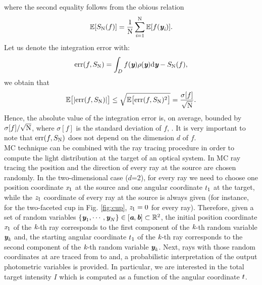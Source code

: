 where the second equality follows from the obious relation
\begin{equation}
\mathbb{E}[S_{\textrm{N}}(f)] = \frac{1}{\textrm{N}}\sum_{\textit{i}=1}^{\textrm{N}}\mathbb{E}[ f(\textit{\textbf{y}}_{\textit{i}})].
\end{equation}
Let us denote the integration error with:
\begin{equation}
\textrm{err}(f, S_{\textrm{N}}) =\int_{D}f(\textit{\textbf{y}})\rho(\textit{\textbf{y}}) \textrm{d}\textit{\textbf{y}}-S_{\textrm{N}}(f),
\end{equation}
we obtain that
\begin{equation}\label{eq:mean_error}
\mathbb{E}\big[|\textrm{err}(f, S_{\textrm{N}})|\big]\leq\sqrt{\mathbb{E}\big[\textrm{err}(f, S_{\textrm{N}})^2\big]} = \frac{\sigma[f]}{\sqrt{\textrm{N}}}.
\end{equation}
Hence, the absolute value of the integration error is, on average, bounded by $\sigma[f]/\sqrt{\textrm{N}}$, where $\sigma[f]$ is the standard deviation of $f$, \cite{leobacher2014introduction}. It is very important to note that $\textrm{err}(f, S_{\textrm{N}})$ does not depend on the dimension $d$ of $f$.
\\ \indent MC technique can be combined with the ray tracing procedure in order to compute the light distribution at the target of an optical system.
In MC ray tracing the position and the direction of  every ray at the source are chosen randomly. 
In the two-dimensional case ($d$=2), for every ray we need to choose one position coordinate $\textit{x}_1$ at the source and one angular coordinate $t_1$ at the target, while the $\textit{z}_1$ coordinate of every ray at the source is always given (for instance, for the two-faceted cup in Fig. \ref{fig:cup}, $\textit{z}_1=0$ for every ray). 
Therefore, given a set of random variables $\{\textit{\textbf{y}}_1, \cdots, \textit{\textbf{y}}_N\}\in [\textit{\textbf{a}}, \textit{\textbf{b}}]\subset\mathbb{R}^2$, the initial position coordinate $\textit{x}_1$ of the $\textit{k}$-th ray corresponds to the first component of the $\textit{k}$-th random variable $\textit{\textbf{y}}_{\textit{k}}$ and, the starting angular coordinate $t_1$ of the $\textit{k}$-th ray corresponds to the second component of the $\textit{k}$-th random variable $\textit{\textbf{y}}_{\textit{k}}$.
Next, rays with those random coordinates at  are traced from  to  and, a probabilistic interpretation of the output photometric variables is provided.
In particular, we are interested in the total target intensity $I$ which is computed as a function of the angular coordinate $t$.

